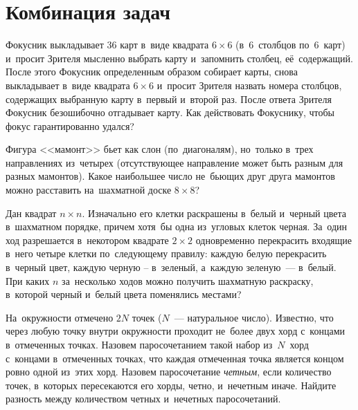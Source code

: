 
\section*{Комбинация задач}



\begin{problems}

\item
Фокусник выкладывает $36$ карт в~виде квадрата $6\times 6$ (в~$6$~столбцов
по~$6$~карт) и~просит Зрителя мысленно выбрать карту и~запомнить столбец,
её~содержащий.
После этого Фокусник определенным образом собирает карты, снова выкладывает
в~виде квадрата $6\times6$ и~просит Зрителя назвать номера столбцов, содержащих
выбранную карту в~первый и~второй раз.
После ответа Зрителя Фокусник безошибочно отгадывает карту.
Как действовать Фокуснику, чтобы фокус гарантированно удался?

\item
Фигура <<мамонт>> бьет как слон (по~диагоналям), но~только в~трех направлениях
из~четырех
(отсутствующее направление может быть разным для разных мамонтов).
Какое наибольшее число не~бьющих друг друга мамонтов можно расставить
на~шахматной доске $8 \times 8$?

\item
Дан квадрат $n \times n$.
Изначально его клетки раскрашены в~белый и~черный цвета в~шахматном порядке,
причем хотя~бы одна из~угловых клеток черная.
За~один ход разрешается в~некотором квадрате $2\times 2$ одновременно
перекрасить входящие в~него четыре клетки по~следующему правилу: каждую белую
перекрасить в~черный цвет, каждую черную – в~зеленый, а~каждую зеленую~---
в~белый.
При каких $n$ за~несколько ходов можно получить шахматную раскраску, в~которой
черный и~белый цвета поменялись местами?

\item
На~окружности отмечено $2 N$ точек ($N$~--- натуральное число).
Известно, что через любую точку внутри окружности проходит не~более двух хорд
с~концами в~отмеченных точках.
Назовем паросочетанием такой набор из~$N$~хорд с~концами в~отмеченных точках,
что каждая отмеченная точка является концом ровно одной из~этих хорд.
Назовем паросочетание \emph{четным}, если количество точек, в~которых
пересекаются его хорды, четно, и~нечетным иначе.
Найдите разность между количеством четных и~нечетных паросочетаний.


\end{problems}
